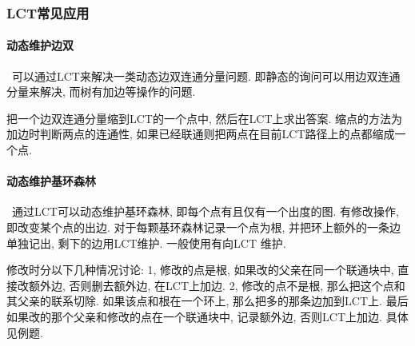 \begin{comment}
\subsubsection{完全动态MST}\
    一个$N$个点$M$条边的无向图, 每次可以修改任意一条边的权值, 在每个修改操作后输出当前最小生成树的边权和. $N,M,Q\leq50000$. 
    \par 我们假设, 有一个图$\{S\}$, 有$k$条边在之后会被修改. 在$k$个MST中, 有些边永远出现在这些MST 中, 而有些边永远不会出现在这些MST中. 我们可以尝试求出这些边, 从而缩小图的规模. 
    \paragraph{找出无用边}将需要修改的边标记为$\infty$, 然后跑MST, 这时不在MST上的且值不为$\infty$边必为无用边, 删除这些边, 减少边数 (注意还原) . 
    \paragraph{找出必须边}将需要修改的边标记为$-\infty$, 然后跑MST, 这时在MST上且不为$-\infty$的边为必须边, 将这些边连接的点合并, 缩小点集 (注意还原) . 
    \par 假设当前区间内需要修改的边数为$k$, 进行删去无用边和找出必须边操作后, 图中最多剩下$k+1$个点和$2k$条边. 如果每次都暴力求MST, 那么时间复杂度为$O(nlg^2n)$; 如果利用排好序的边求MST, 并使用路径压缩+按秩合并的并茶集, 那么时间复杂度为$O(nlgn\alpha (n))$. 
\end{comment}

\subsubsection{LCT常见应用}
                \paragraph{动态维护边双}\
                    可以通过LCT来解决一类动态边双连通分量问题. 即静态的询问可以用边双连通分量来解决, 而树有加边等操作的问题. 
                    \par 把一个边双连通分量缩到LCT的一个点中, 然后在LCT上求出答案. 缩点的方法为加边时判断两点的连通性, 如果已经联通则把两点在目前LCT路径上的点都缩成一个点. 
                \paragraph{动态维护基环森林}\
                    通过LCT可以动态维护基环森林, 即每个点有且仅有一个出度的图. 有修改操作, 即改变某个点的出边. 对于每颗基环森林记录一个点为根, 并把环上额外的一条边单独记出, 剩下的边用LCT维护. 一般使用有向LCT 维护. 
                    \par 修改时分以下几种情况讨论: 1, 修改的点是根, 如果改的父亲在同一个联通块中, 直接改额外边, 否则删去额外边, 在LCT上加边. 2, 修改的点不是根, 那么把这个点和其父亲的联系切除. 如果该点和根在一个环上, 那么把多的那条边加到LCT上. 最后如果改的那个父亲和修改的点在一个联通块中, 记录额外边, 否则LCT上加边. 具体见例题. 
